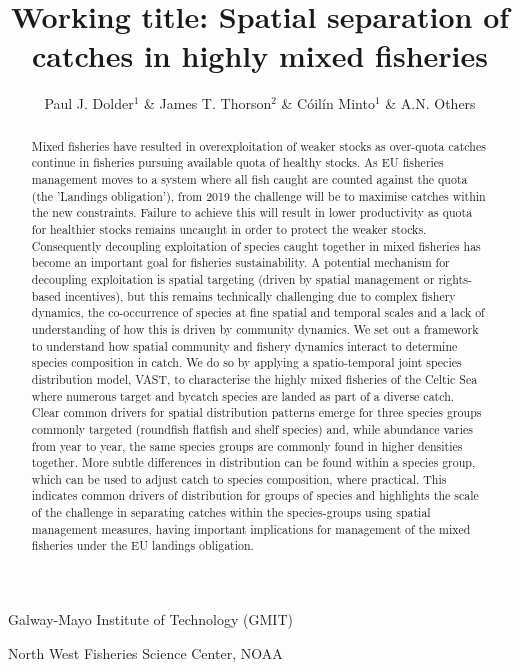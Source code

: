\documentclass{nature}
\title{Working title: Spatial separation of catches in highly mixed fisheries}
\author{Paul J. Dolder$^1$ \& James T. Thorson$^2$ \& Cóilín Minto$^1$ \& A.N.
Others}
\begin{document}
\maketitle

\begin{affiliations}
\item Galway-Mayo Institute of Technology (GMIT) 
\item North West Fisheries Science Center, NOAA
\end{affiliations}

\begin{linenumbers}

\begin{abstract} 
Mixed fisheries have resulted in overexploitation of weaker stocks as
over-quota catches continue in fisheries pursuing available quota of healthy
stocks. As EU fisheries management moves to a system where all fish caught are
counted against the quota (the 'Landings obligation'), from 2019 the challenge
will be to maximise catches within the new constraints. Failure to achieve this
will result in lower productivity as quota for healthier stocks remains
uncaught in order to protect the weaker stocks. Consequently decoupling
exploitation of species caught together in mixed fisheries has become an
important goal for fisheries sustainability. A potential mechanism for
decoupling exploitation is spatial targeting (driven by spatial management or
rights-based incentives), but this remains technically challenging due to
complex fishery dynamics, the co-occurrence of species at fine spatial and
temporal scales and a lack of understanding of how this is driven by community
dynamics.  We set out a framework to understand how spatial community and
fishery dynamics interact to determine species composition in catch. We do so
by applying a spatio-temporal joint species distribution model, VAST, to
characterise the highly mixed fisheries of the Celtic Sea where numerous target
and bycatch species are landed as part of a diverse catch. \\

Clear common drivers for spatial distribution patterns emerge for three species
groups commonly targeted (roundfish flatfish and shelf species) and, while
abundance varies from year to year, the same species groups are commonly found
in higher densities together. More subtle differences in distribution can be
found within a species group, which can be used to adjust catch to species
composition, where practical. This indicates common drivers of distribution for
groups of species and highlights the scale of the challenge in separating
catches within the species-groups using spatial management measures, having
important implications for management of the mixed fisheries under the EU
landings obligation.


\end{abstract}
\end{linenumbers}
\end{document}
